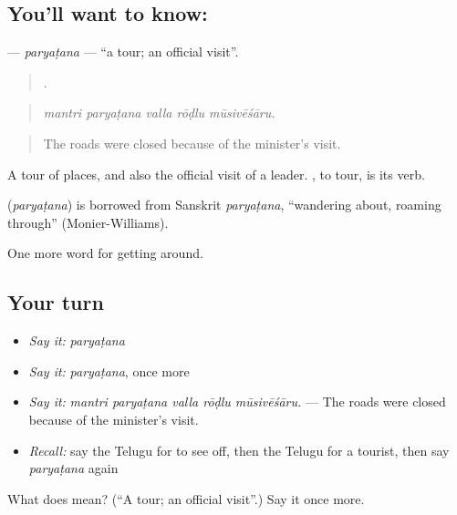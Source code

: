 \subsection*{You'll want to know: }
\textbf{} — \emph{paryaṭana} — \textquotedblleft{}a tour; an official visit\textquotedblright{}.

\begin{quote}
    .
\end{quote}

\begin{quote}
\emph{mantri paryaṭana valla rōḍlu mūsivēśāru.}
\end{quote}

\begin{quote}
The roads were closed because of the minister's visit.
\end{quote}

A tour of places, and also the official visit of a leader. , to tour, is its verb.

\begin{cousinweb}
\textbf{} (\emph{paryaṭana}) is borrowed from Sanskrit \emph{paryaṭana}, \textquotedblleft{}wandering about, roaming through\textquotedblright{} (Monier-Williams).
\end{cousinweb}

\begin{grammarlens}[title={What you've built}]
One more word for getting around.
\end{grammarlens}

\subsection*{Your turn}
\begin{itemize}
\raggedright
  \item \emph{Say it:} \emph{paryaṭana}
  \item \emph{Say it:} \emph{paryaṭana}, once more
  \item \emph{Say it:} \emph{mantri paryaṭana valla rōḍlu mūsivēśāru.} — The roads were closed because of the minister's visit.
  \item \emph{Recall:} say the Telugu for to see off, then the Telugu for a tourist, then say \emph{paryaṭana} again
\end{itemize}

\begin{tcolorbox}[breakable,colback=teal!4,colframe=teal!35!black,title={Before you move on}]
What does  mean? (\textquotedblleft{}A tour; an official visit\textquotedblright{}.) Say it once more.
\end{tcolorbox}
